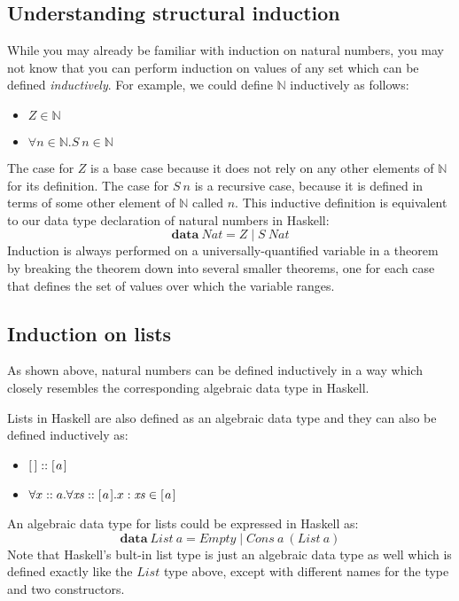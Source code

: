 \subsection{Understanding structural induction}

While you may already be familiar with induction on natural numbers, you may not know that you can perform induction on values of any set which can be defined \emph{inductively}. For example, we could define $\mathbb{N}$ inductively as follows:
\begin{itemize}
\item $Z \in \mathbb{N}$
\item $\forall n \in \mathbb{N}. \mathit{S}~n \in \mathbb{N}$
\end{itemize}
The case for $Z$ is a base case because it does not rely on any other elements of $\mathbb{N}$ for its definition. The case for $S~n$ is a recursive case, because it is defined in terms of some other element of $\mathbb{N}$ called $n$.
This inductive definition is equivalent to our data type declaration of natural numbers in Haskell:
\begin{displaymath}
\mathbf{data}~\mathit{Nat} = Z \mid S~\mathit{Nat}
\end{displaymath}
Induction is always performed on a universally-quantified variable in a theorem by breaking the theorem down into several smaller theorems, one for each case that defines the set of values over which the variable ranges.

\subsection{Induction on lists}

As shown above, natural numbers can be defined inductively in a way which closely resembles the corresponding algebraic data type in Haskell. 

Lists in Haskell are also defined as an algebraic data type and they can also be defined inductively as:
\begin{itemize}
\item $\hslist{} :: \hslist{a}$
\item $\forall x :: a. \forall \mathit{xs} :: [\mskip1.5mu a \mskip1.5mu].x:\mathit{xs} \in [\mskip1.5mu a \mskip1.5mu]$
\end{itemize}
An algebraic data type for lists could be expressed in Haskell as:
\begin{displaymath}
\mathbf{data}~\mathit{List}~a = \mathit{Empty} \mid \mathit{Cons}~a~(\mathit{List}~a)
\end{displaymath}
Note that Haskell's bult-in list type is just an algebraic data type as well which is defined exactly like the $\mathit{List}$ type above, except with different names for the type and two constructors.
